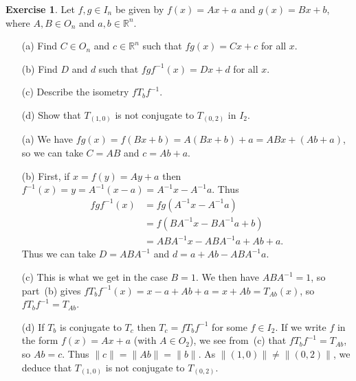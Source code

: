 \documentclass{amsart}
\renewcommand{\:}{\colon}
\newcommand{\R}{\mathbb{R}}
\theoremstyle{definition}
\newtheorem{exercise}{Exercise}
\newenvironment{solution}{{\noindent\bf Solution:}}{}
\begin{document}
\begin{exercise}
 Let $f,g\in I_n$ be given by $f(x)=Ax+a$ and $g(x)=Bx+b$, where
 $A,B\in O_n$ and $a,b\in\R^n$.
 \begin{itemize}
 \item[(a)] Find $C\in O_n$ and $c\in\R^n$ such that $fg(x)=Cx+c$ for
  all $x$.
 \item[(b)] Find $D$ and $d$ such that $fgf^{-1}(x)=Dx+d$ for all $x$.
 \item[(c)] Describe the isometry $fT_bf^{-1}$.
 \item[(d)] Show that $T_{(1,0)}$ is not conjugate to $T_{(0,2)}$ in
  $I_2$.   
 \end{itemize}
\end{exercise}
\begin{solution}
 \begin{itemize}
 \item[(a)] We have $fg(x)=f(Bx+b)=A(Bx+b)+a=ABx+(Ab+a)$, so we can
  take $C=AB$ and $c=Ab+a$.
 \item[(b)] First, if $x=f(y)=Ay+a$ then
  $f^{-1}(x)=y=A^{-1}(x-a)=A^{-1}x-A^{-1}a$.  Thus 
  \begin{align*}
   fgf^{-1}(x) &= fg(A^{-1}x - A^{-1}a) \\
               &= f(BA^{-1}x - BA^{-1}a + b) \\
               &= ABA^{-1}x - ABA^{-1}a + Ab + a.
  \end{align*}
  Thus we can take $D=ABA^{-1}$ and $d=a+Ab-ABA^{-1}a$.
 \item[(c)] This is what we get in the case $B=1$.  We then have
  $ABA^{-1}=1$, so part~(b) gives
  $fT_bf^{-1}(x)=x-a+Ab+a=x+Ab=T_{Ab}(x)$, so $fT_bf^{-1}=T_{Ab}$.
 \item[(d)] If $T_b$ is conjugate to $T_c$ then $T_c=fT_bf^{-1}$ for
  some $f\in I_2$.  If we write $f$ in the form $f(x)=Ax+a$ (with
  $A\in O_2$), we see from~(c) that $fT_bf^{-1}=T_{Ab}$, so $Ab=c$.
  Thus $\|c\|=\|Ab\|=\|b\|$.  As $\|(1,0)\|\neq\|(0,2)\|$, we deduce
  that $T_{(1,0)}$ is not conjugate to $T_{(0,2)}$.  
 \end{itemize}
\end{solution}
\end{document}
